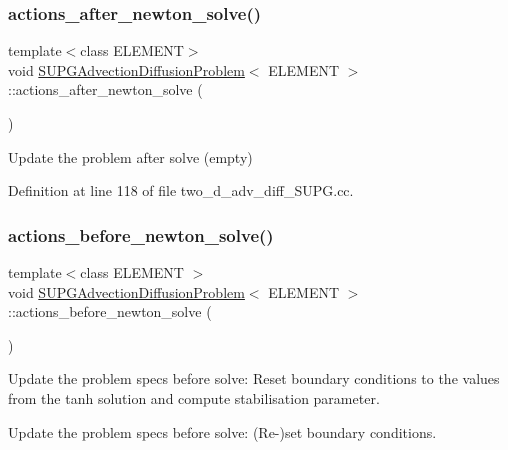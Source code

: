 \subsubsection{\texorpdfstring{actions\+\_\+after\+\_\+newton\+\_\+solve()}{actions\_after\_newton\_solve()}}
{\footnotesize\ttfamily template$<$class E\+L\+E\+M\+E\+NT$>$ \\
void \hyperlink{classSUPGAdvectionDiffusionProblem}{S\+U\+P\+G\+Advection\+Diffusion\+Problem}$<$ E\+L\+E\+M\+E\+NT $>$\+::actions\+\_\+after\+\_\+newton\+\_\+solve (\begin{DoxyParamCaption}{ }\end{DoxyParamCaption})\hspace{0.3cm}{\ttfamily [inline]}}



Update the problem after solve (empty) 



Definition at line 118 of file two\+\_\+d\+\_\+adv\+\_\+diff\+\_\+\+S\+U\+P\+G.\+cc.

\mbox{\label{classSUPGAdvectionDiffusionProblem_affa45863033de517e1fba088aaae7eb5}} 
\subsubsection{\texorpdfstring{actions\+\_\+before\+\_\+newton\+\_\+solve()}{actions\_before\_newton\_solve()}}
{\footnotesize\ttfamily template$<$class E\+L\+E\+M\+E\+NT $>$ \\
void \hyperlink{classSUPGAdvectionDiffusionProblem}{S\+U\+P\+G\+Advection\+Diffusion\+Problem}$<$ E\+L\+E\+M\+E\+NT $>$\+::actions\+\_\+before\+\_\+newton\+\_\+solve (\begin{DoxyParamCaption}{ }\end{DoxyParamCaption})}



Update the problem specs before solve\+: Reset boundary conditions to the values from the tanh solution and compute stabilisation parameter. 

Update the problem specs before solve\+: (Re-\/)set boundary conditions. 

